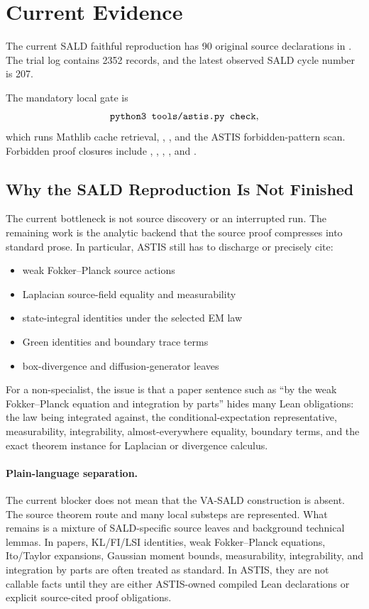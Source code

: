 \section{Current Evidence}

The current SALD faithful reproduction has 90 original source
declarations in .  The
trial log contains 2352 records, and the latest observed SALD cycle
number is 207.

The mandatory local gate is
\[
  \Lean{python3 tools/astis.py check},
\]
which runs Mathlib cache retrieval, , ,
and the ASTIS forbidden-pattern scan.  Forbidden proof closures include
, , , , and
.

\subsection{Why the SALD Reproduction Is Not Finished}

The current bottleneck is not source discovery or an interrupted run.  The
remaining work is the analytic backend that the source proof compresses into
standard prose.  In particular, ASTIS still has to discharge or precisely cite:
\begin{itemize}
\item weak Fokker--Planck source actions
\item Laplacian source-field equality and measurability
\item state-integral identities under the selected EM law
\item Green identities and boundary trace terms
\item box-divergence and diffusion-generator leaves
\end{itemize}

For a non-specialist, the issue is that a paper sentence such as ``by the weak
Fokker--Planck equation and integration by parts'' hides many Lean obligations:
the law being integrated against, the conditional-expectation representative,
measurability, integrability, almost-everywhere equality, boundary terms, and
the exact theorem instance for Laplacian or divergence calculus.

\paragraph{Plain-language separation.}
The current blocker does not mean that the VA-SALD construction is absent.
The source theorem route and many local substeps are represented.  What remains
is a mixture of SALD-specific source leaves and background technical lemmas.
In papers, KL/FI/LSI identities, weak Fokker--Planck equations, Ito/Taylor
expansions, Gaussian moment bounds, measurability, integrability, and
integration by parts are often treated as standard.  In ASTIS, they are not
callable facts until they are either ASTIS-owned compiled Lean declarations or
explicit source-cited proof obligations.


